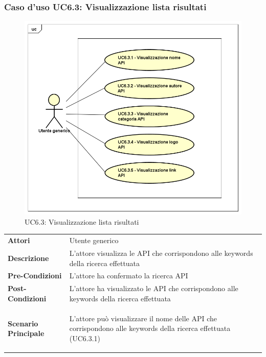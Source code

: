 \newpage
\subsubsection{Caso d'uso UC6.3: Visualizzazione lista risultati}
\label{UC6_3}
\begin{figure}[ht]
	\centering
	\includegraphics[scale=0.45]{UML/UC6_3.png}
	\caption{UC6.3: Visualizzazione lista risultati}
\end{figure}

\begin{minipage}{\linewidth}
	\begin{tabular}{ l | p{11cm}}
		\hline
		\rowcolor{Gray}
		\multicolumn{2}{c}{UC6.3 - Visualizzazione lista risultati} \\
		\hline
		\textbf{Attori} & Utente generico \\
		\textbf{Descrizione} & L'attore visualizza le API che corrispondono alle keywords della ricerca effettuata \\
		\textbf{Pre-Condizioni} & L'attore ha confermato la ricerca API \\
		\textbf{Post-Condizioni} & L'attore ha visualizzato le API che corrispondono alle keywords della ricerca effettuata \\
		\textbf{Scenario Principale} & 
		\begin{enumerate*}[label=(\arabic*.),itemjoin={\newline}]
			\item L'attore può visualizzare il nome delle API che corrispondono alle keywords della ricerca effettuata (UC6.3.1)
			\
		\end{enumerate*}\\
	\end{tabular}
\end{minipage}

